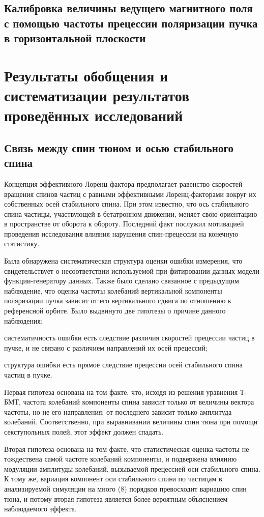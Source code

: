 \documentclass{report}
\begin{document}
\section{Калибровка величины ведущего магнитного поля с помощью частоты прецессии поляризации пучка в горизонтальной плоскости}

\chapter{Результаты обобщения и систематизации результатов проведённых исследований}
\section{Связь между спин тюном и осью стабильного спина}
Концепция эффективного Лоренц-фактора предполагает равенство скоростей вращения спинов частиц с равными эффективными Лоренц-факторами вокруг их собственных осей стабильного спина. При этом известно, что ось стабильного спина частицы, участвующей в бетатронном движении, меняет свою ориентацию в пространстве от оборота к обороту. Последний факт послужил мотивацией проведения исследования влияния нарушения спин-прецессии на конечную статистику.

Была обнаружена систематическая структура оценки ошибки измерения, что свидетельствует о несоответствии используемой при фитировании данных модели функции-генератору данных. Также было сделано связанное с предыдущим наблюдение, что оценка частоты колебаний вертикальной компоненты поляризации пучка зависит от его вертикального сдвига по отношению к референсной орбите. Было выдвинуто две гипотезы о причине данного наблюдения:
\begin{inparaenum}
\item систематичность ошибки есть следствие различия скоростей прецессии частиц в пучке, и не связано с различием направлений их осей прецессий;
\item структура ошибки есть прямое следствие прецессии осей стабильного спина частиц в пучке.
\end{inparaenum}

Первая гипотеза основана на том факте, что, исходя из решения уравнения Т-БМТ, частота колебаний компоненты спина зависит только от величины вектора частоты, но не его направления; от последнего зависит только амплитуда колебаний. Соответственно, при выравнивании величины спин тюна при помощи секступольных полей, этот эффект должен спадать.

Вторая гипотеза основана на том факте, что статистическая оценка частоты не тождествена самой частоте колебаний компоненты, и подвержена влиянию модуляции амплитуды колебаний, вызываемой прецессией оси стабильного спина. К тому же, вариация компонент оси стабильного спина по частицам в анализируемой симуляции на много (8) порядков превосходит вариацию спин тюна, и потому вторая гипотеза является более вероятным объяснением наблюдаемого эффекта.
\end{document}
